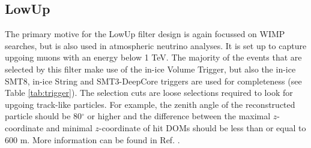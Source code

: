 
\subsection{LowUp}
The primary motive for the LowUp filter design is again focussed on WIMP searches, but is also used in atmospheric neutrino analyses. It is set up to capture upgoing muons with an energy below 1 TeV. The majority of the events that are selected by this filter make use of the in-ice Volume Trigger, but also the in-ice SMT8, in-ice String and SMT3-DeepCore triggers are used for completeness (see Table \ref{tab:trigger}). The selection cuts are loose selections required to look for upgoing track-like particles. For example, the zenith angle of the reconstructed particle should be 80$^\circ$ or higher and the difference between the maximal $z$-coordinate and minimal $z$-coordinate of hit DOMs should be less than or equal to 600 m. More information can be found in Ref. \cite{LowUp2012}.


